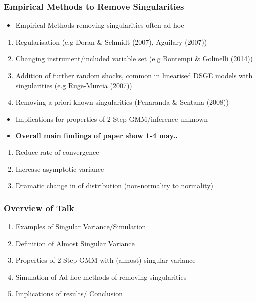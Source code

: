 \documentclass{beamer}
\begin{document}
\begin{frame}
\frametitle{Empirical Methods to Remove Singularities}
\begin{itemize}
\vspace{10pt}
\item[]Empirical Methods removing singularities often ad-hoc

\end{itemize}
\begin{enumerate}
\item Regularisation (e.g Doran \& Schmidt (2007), Aguilary (2007))
\vspace{10pt}
\item Changing instrument/included variable set (e.g Bontempi \& Golinelli (2014))
\vspace{10pt}
 \item Addition of further  random shocks, common in linearised DSGE models with singularities (e.g Ruge-Murcia (2007))
 \vspace{10pt}
 \item Removing a priori known singularities (Penaranda \& Sentana (2008))
\end{enumerate}
\vspace{10pt}
\begin{itemize}
\pause
\item[] Implications  for properties of 2-Step GMM/inference unknown
\item[] \textbf{Overall main findings  of paper show 1-4 may..}
\end{itemize}

\begin{enumerate}
\item[i] Reduce rate of convergence
\item[ii] Increase asymptotic variance
\item[iii] Dramatic change in  of distribution (non-normality to normality)

\end{enumerate}
\end{frame}



\begin{frame}
\frametitle{Overview of Talk}
\begin{enumerate}

\item Examples of Singular Variance/Simulation
\vspace{10pt}
\item Definition of Almost Singular Variance
\vspace{10pt}
\item Properties of 2-Step GMM with (almost) singular variance
\vspace{10pt}
\item Simulation of Ad hoc methods of removing singularities
\vspace{10pt}
\item Implications of results/ Conclusion
\end{enumerate}
\end{frame}
\end{document}
